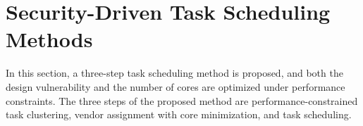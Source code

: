 \documentclass[10pt,journal, compsoc]{IEEEtran}
\begin{document}


















\section{Security-Driven Task Scheduling Methods}

In this section, a three-step task scheduling method is proposed, and both the design vulnerability and the number of cores are optimized under performance constraints. The three steps of the proposed method are performance-constrained task clustering, vendor assignment with core minimization, and task scheduling.
\end{document}
